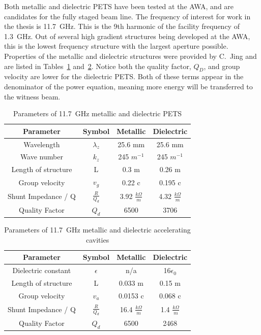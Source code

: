 Both metallic and dielectric PETS have been tested at the AWA, 
and are candidates for the fully staged beam line. 
The frequency of interest for work in the thesis is \SI{11.7}{GHz}. 
This is the 9th harmonic of the facility frequency of \SI{1.3}{GHz}.
Out of several high gradient structures being developed at the AWA, 
this is the lowest frequency structure with the largest aperture possible. 
Properties of the metallic and dielectric structures were provided by C.~Jing and are listed in 
Tables~\ref{table:PETS} and~\ref{table:acc}. 
Notice both the quality factor, $Q_D$, and group velocity are lower for the dielectric PETS. 
Both of these terms appear in the denominator of the power equation, meaning more
energy will be transferred to the witness beam.
\begin{table}
	\begin{center}
	\caption{Parameters of \SI{11.7}{GHz} metallic and dielectric PETS}
	\label{table:PETS}
	
			\begin{tabular}{cccc}  
			\toprule
			\toprule
			\textbf{Parameter} & \textbf{Symbol} & \textbf{Metallic }& \textbf{Dielectric} \\
			\midrule
			Wavelength 	& $\lambda_{z}$ & 25.6 mm 	&  25.6 mm	\\  
			Wave number & $k_{z}$ 		& 245 $m^{-1}$ 	& 245 $m^{-1}$\\  
			Length of structure & L & 0.3 m & 0.26 m\\  
			Group velocity & $v_{g}$ & 0.22 c & 0.195 c\\  
			Shunt Impedance / Q & $\frac{R}{Q_{d}}$ & 3.92 $\frac{k\Omega}{m}$  & 4.32 $\frac{k\Omega}{m}$\\  
			Quality Factor & $Q_{d}$ & 6500 &3706\\  
			\bottomrule		
		\end{tabular}
\end{center}
\end{table}
\begin{table}
	\begin{center}
		\caption{Parameters of \SI{11.7}{GHz} metallic and dielectric accelerating cavities}
		\label{table:acc}
		
		\begin{tabular}{cccc}  
			\toprule
			\toprule
			\textbf{Parameter} & \textbf{Symbol} & \textbf{Metallic }& \textbf{Dielectric} \\
			\midrule
			Dielectric constant & $\epsilon$ & n/a & 16\;$\epsilon_0$ \\
			Length of structure & L & 0.033 m & 0.15 m\\  
			Group velocity & $v_{a}$ & 0.0153 c & 0.068 c\\  
			Shunt Impedance / Q & $\frac{R}{Q_{d}}$ & 16.4 $\frac{k\Omega}{m}$  & 1.4 $\frac{k\Omega}{m}$\\  
			Quality Factor & $Q_{d}$ & 6500  &2468\\  
			\bottomrule		
		\end{tabular}
	\end{center}
\end{table}

